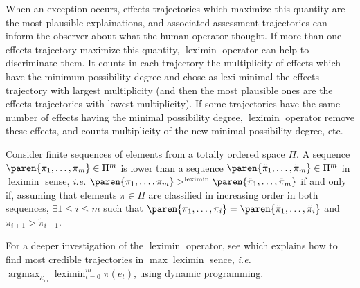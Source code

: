 When an exception occurs, 
effects trajectories which maximize this quantity 
are the most plausible explainations, 
and associated assessment trajectories 
can inform the observer about what the human operator thought.
If more than one effects trajectory maximize this quantity, 
$\operatorname*{leximin}$ operator can help to discriminate them.
It counts in each trajectory 
the multiplicity of effects 
which have the minimum possibility degree 
and chose as lexi-minimal the effects trajectory 
with largest multiplicity 
(and then the most plausible ones 
are the effects trajectories with lowest multiplicity). 
If some trajectories have the same number of effects 
having the minimal possibility degree,
$\operatorname*{leximin}$ operator remove these effects, 
and counts multiplicity of the new minimal 
possibility degree, etc. 
\begin{Def}[Leximin]
\label{leximin}
Consider finite sequences of elements 
from a totally ordered space $\Pi$.
A sequence  
$\paren{ \pi_1,\ldots,\pi_m } \in \Pi^{m}$
is lower than a sequence 
$\paren{ \tilde{\pi}_1,\ldots,\tilde{\pi}_{m} } \in \Pi^{m}$ 
in $\operatorname*{leximin}$ sense, 
\textit{i.e.} $\paren{ \pi_1,\ldots,\pi_m } >^{\operatorname*{leximin} } \paren{ \tilde{\pi}_1,\ldots,\tilde{\pi}_{m} }$ 
if and only if, 
assuming that elements $\pi \in \Pi$ 
are classified in increasing order in both sequences, 
$\exists 1 \leqslant i \leqslant m$ 
such that $\paren{ \pi_1,\ldots,\pi_i } = \paren{ \tilde{\pi}_1,\ldots,\tilde{\pi}_i }$
and $\pi_{i+1} > \tilde{\pi}_{i+1}$.
\end{Def} 
For a deeper investigation of the $\operatorname*{leximin}$ operator, 
see \cite{Dubois05b} which explains
how to find most credible trajectories 
in $\max \operatorname*{leximin}$ sence, \textit{i.e.} 
$\displaystyle \operatorname*{argmax}_{\mathcal{E}_m} \operatorname*{leximin}_{t=0}^m \pi(e_t)$, 
using dynamic programming.


